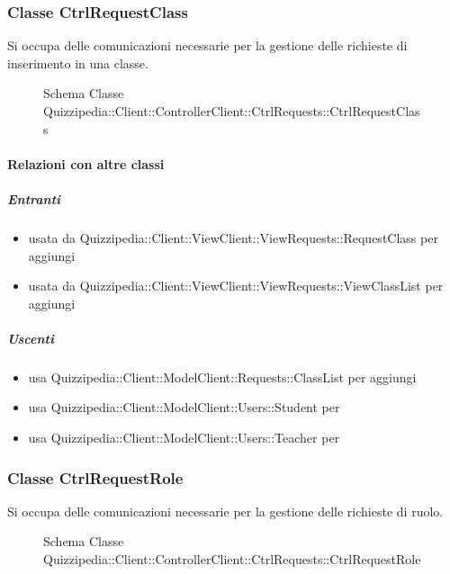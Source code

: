 \subsubsection{Classe CtrlRequestClass}
Si occupa delle comunicazioni necessarie per la gestione delle richieste di inserimento in una classe.
\begin{figure}[H]
\centering
\noindent{}
\caption[Schema Classe CtrlRequestClass]{Schema Classe Quizzipedia::Client::ControllerClient::CtrlRequests::CtrlRequestClass}
\end{figure}
\paragraph{Relazioni con altre classi}
\subparagraph{Entranti}
\begin{itemize}
\item usata da Quizzipedia::Client::ViewClient::ViewRequests::RequestClass per aggiungi
\item usata da Quizzipedia::Client::ViewClient::ViewRequests::ViewClassList per aggiungi
\end{itemize}
\subparagraph{Uscenti}
\begin{itemize}
\item usa Quizzipedia::Client::ModelClient::Requests::ClassList per aggiungi
\item usa Quizzipedia::Client::ModelClient::Users::Student per 
\item usa Quizzipedia::Client::ModelClient::Users::Teacher per 
\end{itemize}
\subsubsection{Classe CtrlRequestRole}
Si occupa delle comunicazioni necessarie per la gestione delle richieste di ruolo.
\begin{figure}[H]
\centering
\noindent{}
\caption[Schema Classe CtrlRequestRole]{Schema Classe Quizzipedia::Client::ControllerClient::CtrlRequests::CtrlRequestRole}
\end{figure}
